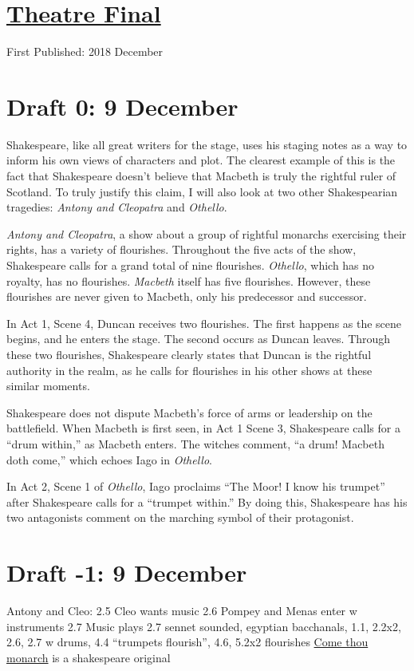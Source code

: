 \documentclass[12pt]{article}[titlepage]
\newcommand{\say}[1]{``#1''}
\newcommand{\1}{\={a}}
\newcommand{\2}{\={e}}
\newcommand{\3}{\={\i}}
\newcommand{\4}{\=o}
\newcommand{\5}{\=u}
\newcommand{\6}{\={A}}
\renewcommand{\,}{\textsuperscript{,}}
\begin{document}
\doublespacing
\section{\href{theatre-final.html}{Theatre Final}}
First Published: 2018 December 
\section{Draft 0: 9 December}
Shakespeare, like all great writers for the stage, uses his staging notes as a way to inform his own views of characters and plot.
The clearest example of this is the fact that Shakespeare doesn't believe that Macbeth is truly the rightful ruler of Scotland.
To truly justify this claim, I will also look at two other Shakespearian tragedies: \textit{Antony and Cleopatra} and \textit{Othello}.

\textit{Antony and Cleopatra}, a show about a group of rightful monarchs exercising their rights, has a variety of flourishes.
Throughout the five acts of the show, Shakespeare calls for a grand total of nine flourishes.
\textit{Othello}, which has no royalty, has no flourishes.
\textit{Macbeth} itself has five flourishes.
However, these flourishes are never given to Macbeth, only his predecessor and successor.

In Act 1, Scene 4, Duncan receives two flourishes.
The first happens as the scene begins, and he enters the stage.
The second occurs as Duncan leaves.
Through these two flourishes, Shakespeare clearly states that Duncan is the rightful authority in the realm, as he calls for flourishes in his other shows at these similar moments.

Shakespeare does not dispute Macbeth's force of arms or leadership on the battlefield.
When Macbeth is first seen, in Act 1 Scene 3, Shakespeare calls for a \say{drum within,} as Macbeth enters.
The witches comment, \say{a drum! Macbeth doth come,} which echoes Iago in \textit{Othello}.

In Act 2, Scene 1 of \textit{Othello}, Iago proclaims \say{The Moor! I know his trumpet} after Shakespeare calls for a \say{trumpet within.}
By doing this, Shakespeare has his two antagonists comment on the marching symbol of their protagonist.
\section{Draft -1: 9 December}
Antony and Cleo:
2.5 Cleo wants music
2.6 Pompey and Menas enter w instruments
2.7 Music plays
2.7 sennet sounded, egyptian bacchanals, 
1.1, 2.2x2, 2.6, 2.7 w drums, 4.4 \say{trumpets flourish}, 4.6, 5.2x2 flourishes
\href{http://www.lieder.net/lieder/get_text.html?TextId=18775}{Come thou monarch}  is a shakespeare original 
\end{document}
